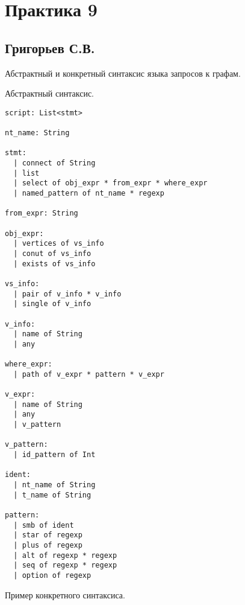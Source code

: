 \section{Практика 9}

\subsection{Григорьев С.В.}

Абстрактный и конкретный синтаксис языка запросов к графам.

Абстрактный синтаксис.

\begin{verbatim}
script: List<stmt>

nt_name: String

stmt:
  | connect of String
  | list
  | select of obj_expr * from_expr * where_expr
  | named_pattern of nt_name * regexp

from_expr: String

obj_expr:
  | vertices of vs_info  
  | conut of vs_info
  | exists of vs_info

vs_info:
  | pair of v_info * v_info
  | single of v_info

v_info:
  | name of String
  | any
  
where_expr:
  | path of v_expr * pattern * v_expr

v_expr: 
  | name of String
  | any 
  | v_pattern

v_pattern:
  | id_pattern of Int   

ident: 
  | nt_name of String 
  | t_name of String

pattern: 
  | smb of ident
  | star of regexp
  | plus of regexp
  | alt of regexp * regexp
  | seq of regexp * regexp
  | option of regexp

\end{verbatim}

Пример конкретного синтаксиса.

